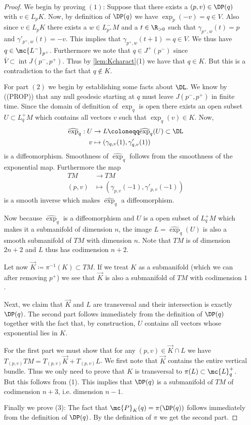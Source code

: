 \begin{proof}
We begin by proving $(1)$: Suppose that there exists a $(p,v) \in \DP(q)$ with $v\in L_pK$. Now, by definition of $\DP(q)$ we have $\exp_p(-v) = q\in V$. Also since $v\in L_pK$ there exists a $w\in L^-_{p^+}M$ and a $t\in \R_{>0}$ such that $\gamma_{p^+,w}(t) = p$ and $\gamma'_{p^+,w}(t) = -v$. This implies that $\gamma_{p^+,w}(t+1) = q \in V$. We thus have $q \in \mc{L^-}_{p^+}$. Furthermore we note that $q\in J^+(p^-)$ since $\overline{V}\subset \operatorname{int}J(p^-,p^+)$.
Thus by \ref{lem:Kcharact}(1) we have that $q\in K$. But this is a contradiction to the fact that $q\notin K$.

For part $(2)$ we begin by establishing some facts about $\DL$. We know by ((PROP)) that any null geodesic starting at $q$ must leave $J(p^-,p^+)$ in finite time. Since the domain of definition of $\exp_q$ is open there exists an open subset $U\subset L^+_qM$ which contains all vectors $v$ such that $\exp_q(v)\in K$. Now, 
\begin{align*}
    \widehat{\exp}_q: U &\to L\coloneqq \widehat{\exp}_q(U) \subset \DL \\
    v &\mapsto (\gamma_{q,v}(1),\gamma'_{q,v}(1))
\end{align*}
is a diffeomorphism. Smoothness of $\widehat{\exp}_q$ follows from the smoothness of the exponential map. Furthermore the map
\begin{align*}
    TM &\to TM \\
    (p,v) &\mapsto (\gamma_{p,v}(-1),\gamma'_{p,v}(-1))
\end{align*}
is a smooth inverse which makes $\widehat{\exp}_q$ a diffeomorphism.

Now because $\widehat{\exp}_q$ is a diffeomorphism and $U$ is a open subset of $L^+_qM$ which makes it a submanifold of dimension $n$, the image $L=\widehat{\exp}_q(U)$ is also a smooth submanifold of $TM$ with dimension $n$. Note that $TM$ is of dimension $2n+2$ and $L$ thus has codimension $n+2$.

Let now $\overrightarrow{K}\coloneqq \pi^{-1}(K)\subset TM$. If we treat $K$ as a submanifold (which we can after removing $p^+$) we see that $\overrightarrow{K}$ is also a submanifold of $TM$ with codimension $1$.

Next, we claim that $\overrightarrow{K}$ and $L$ are transversal and their intersection is exactly $\DP(q)$. The second part follows immediately from the definition of $\DP(q)$ together with the fact that, by construction, $U$ contains all vectors whose exponential lies in $K$. 

For the first part we must show that for any $(p,v)\in \overrightarrow{K} \cap L$ we have $T_{(p,v)}TM = T_{(p,v)}\overrightarrow{K} + T_{(p,v)}L$. 
We first note that $\overrightarrow{K}$ contains the entire vertical bundle. Thus we only need to prove that $K$ is transversal to $\pi(L)\subset \mc{L}^+_q$. But this follows from (1). This implies that $\DP(q)$ is a submanifold of $TM$ of codimension $n+3$, i.e. dimension $n-1$.

Finally we prove (3): The fact that $\mc{P}_K(q) = \pi( \DP(q))$ follows immediately from the definition of $\DP(q)$. By the definition of $\pi$ we get the second part.
\end{proof}

